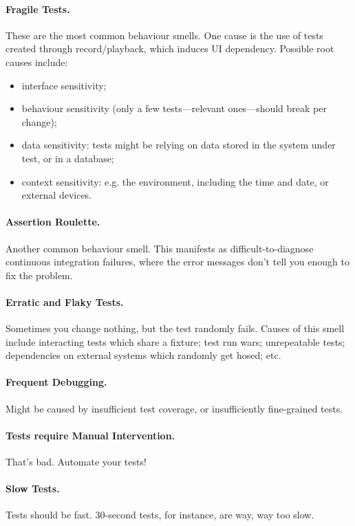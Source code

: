 \documentclass[11pt]{article}
\newenvironment{itemizep}{
 \begin{itemize}
  \setlength{\itemsep}{0pt}
  \setlength{\parsep}{3pt}
  \setlength{\topsep}{3pt}
  \setlength{\partopsep}{0pt}
  \setlength{\leftmargin}{1.5em}
  \setlength{\labelwidth}{1em}
  \setlength{\labelsep}{0.5em} }
 {\end{itemize}}
\begin{document}
\paragraph{Fragile Tests.} These are the most common behaviour smells. One cause is the use of
tests created through record/playback, which induces UI dependency. Possible root causes include:
\begin{itemizep}
\item interface sensitivity;
\item behaviour sensitivity (only a few tests---relevant ones---should break per change);
\item data sensitivity: tests might be relying on data stored in the system under test, or in a database;
\item context sensitivity: e.g. the environment, including the time and date, or external devices.
\end{itemizep}

\paragraph{Assertion Roulette.} Another common behaviour smell. This manifests as difficult-to-diagnose
continuous integration failures, where the error messages don't tell you enough to fix the problem.

\paragraph{Erratic and Flaky Tests.} Sometimes you change nothing, but the test randomly fails. 
Causes of this smell include interacting tests which share a fixture; test run wars; unrepeatable tests;
dependencies on external systems which randomly get hosed; etc.

\paragraph{Frequent Debugging.} Might be caused by insufficient test coverage, or insufficiently 
fine-grained tests.

\paragraph{Tests require Manual Intervention.} That's bad. Automate your tests!

\paragraph{Slow Tests.} Tests should be fast. 30-second tests, for instance, are way, way too slow.
\end{document}
